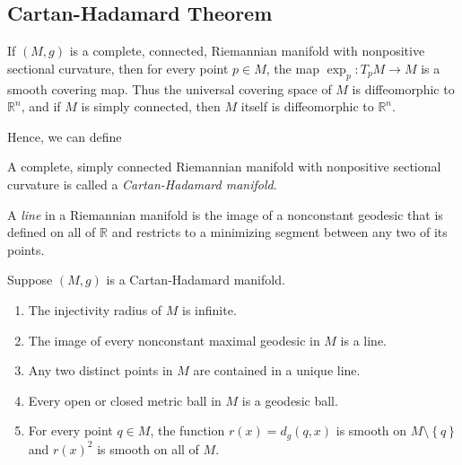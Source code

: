 \subsection{Cartan-Hadamard Theorem}
\label{subsection-Cartan-Hadamard-theorem}

\begin{theorem}
  \label{theorem-Cartan-Hadamard}
  If \( (M, g) \) is a complete, connected, Riemannian manifold with nonpositive sectional curvature, then for every point \( p \in M \), the map \( \exp_p: T_p M \to M \) is a smooth covering map.
  Thus the universal covering space of \( M \) is diffeomorphic to \( \mathbb{R}^n \), and if \( M \) is simply connected, then \( M \) itself is diffeomorphic to \( \mathbb{R}^n \).
\end{theorem}

Hence, we can define
\begin{definition}
  \label{definition-Cartan-Hadamard-manifold}
  A complete, simply connected Riemannian manifold with nonpositive sectional curvature is called a \emph{Cartan-Hadamard manifold}.
\end{definition}

\begin{definition}
  \label{definition-line-in-Riemannian-manifold}
  A \emph{line} in a Riemannian manifold is the image of a nonconstant geodesic that is defined on all of \( \mathbb{R} \) and restricts to a minimizing segment between any two of its points.
\end{definition}

\begin{proposition}
  \label{proposition-basic-properties-of-CH-manifold}
  Suppose \( (M, g) \) is a Cartan-Hadamard manifold.
  \begin{enumerate}
    \item The injectivity radius of \( M \) is infinite.
    \item The image of every nonconstant maximal geodesic in \( M \) is a line.
    \item Any two distinct points in \( M \) are contained in a unique line.
    \item Every open or closed metric ball in \( M \) is a geodesic ball.
    \item For every point \( q \in M \), the function \( r(x) = d_g (q, x) \) is smooth on \( M \setminus \left\lbrace q \right\rbrace \) and \( r(x)^2 \) is smooth on all of \( M \).
  \end{enumerate}
\end{proposition}

